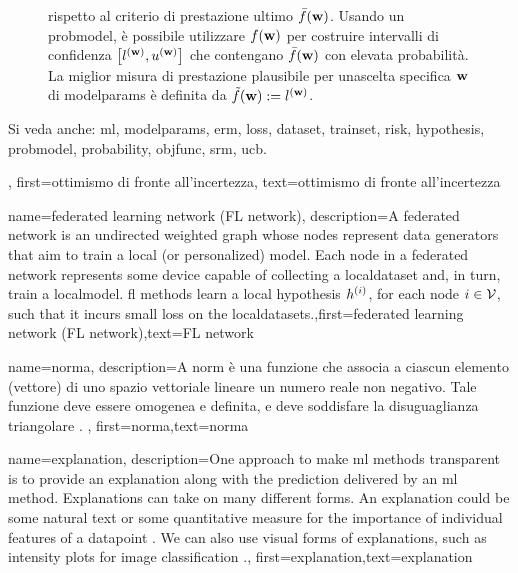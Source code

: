 {{\begin{figure}[H]
\begin{center}
{	rispetto al criterio di prestazione ultimo $\bar{f}({\bf w})$. Usando un \gls{probmodel}, è possibile utilizzare $f({\bf w})$  
	per costruire intervalli di confidenza  $\big[ l^{({\bf w})},  u^{({\bf w})} \big]$ che contengano $\bar{f}({\bf w})$  
	con elevata probabilità. La miglior misura di prestazione plausibile per unascelta specifica ${\bf w}$ di \gls{modelparams} 
	è definita da $\tilde{f}({\bf w}) := l^{({\bf w})}$.} 
	\end{center}
		\end{figure}
		Si veda anche: \gls{ml}, \gls{modelparams}, \gls{erm}, \gls{loss}, \gls{dataset}, \gls{trainset}, \gls{risk}, \gls{hypothesis}, \gls{probmodel}, \gls{probability}, \gls{objfunc}, \gls{srm}, \gls{ucb}.},
	first={ottimismo di fronte all’incertezza},
	text={ottimismo di fronte all’incertezza} 
}
{name={federated learning network (FL network)},
	description={A federated network is an undirected weighted \gls{graph} whose 
		nodes represent \gls{data} generators that aim to train a local (or personalized) \gls{model}. 
		Each node in a federated network represents some \gls{device} capable of collecting a \gls{localdataset} 
		and, in turn, train a \gls{localmodel}. 
	    \Gls{fl} methods learn a local \gls{hypothesis} $h^{(i)}$, for 
	    each node $i \in \mathcal{V}$, such that it incurs small \gls{loss} on the \gls{localdataset}s.},first={federated learning network (FL network)},text={FL network} 
}

{name={norma},
	description={A norm è una funzione che associa a ciascun elemento (vettore) 
	di uno spazio vettoriale lineare un numero reale non negativo. Tale funzione deve essere omogenea e definita, e deve soddisfare la disuguaglianza triangolare \cite{HornMatAnalysis}. },
	first={norma},text={norma} 
}

{name={explanation},
	description={One approach to make \gls{ml} methods transparent is to provide an 
		explanation along with the \gls{prediction} delivered by an 
		\gls{ml} method. Explanations can take on many different forms. An explanation 
		could be some natural text or some quantitative measure for the importance 
		of individual \gls{feature}s of a \gls{datapoint} \cite{Molnar2019}. We can also 
		use visual forms of explanations, such as intensity plots for image \gls{classification} \cite{GradCamPaper}.},
	first={explanation},text={explanation} 
}

